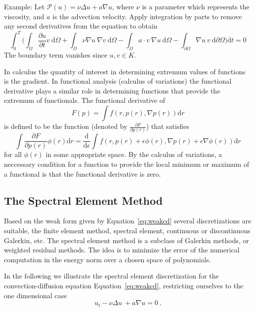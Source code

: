 \documentclass[10pt]{article}
\renewcommand{\d}{\mathrm{d}}
\begin{document}
{Example: Let $\mathcal P( u) = \nu \Delta  u +  a  \nabla  u$, where $\nu$ is a parameter which represents the viscosity, and $ a$ is the advection velocity. Apply integration by parts to remove any second derivatives from the equation to obtain
\begin{equation}
\int_0^T \bigg( \int_{\Omega}\frac{\partial u}{\partial t}  v \ \d \Omega + \int_{\Omega} \nu\nabla  u\ \nabla  v\ \d \Omega - \int_{\Omega}  a \cdot  v\ \nabla  u\ \d \Omega-
 \int_{\partial \Omega} \nabla  u \  v\  \d \partial \Omega \bigg) \d t =0\label{eq:weakcd}
\end{equation}
The boundary term vanishes since $ u,  v \in K.$

In calculus the quantity of interest in determining extremum values of functions is the gradient. In functional analysis (calculus of variations) the functional
derivative plays a similar role in determining functions that provide the extremum of functionals. The functional derivative of
\[
F(p) = \int f(r,p(r),\nabla p(r)) \d r
\]
is defined to be the function (denoted by $ \frac{\partial F}{\partial p(r)}$) that satisfies
\[
\int \frac{\partial F}{\partial p(r)} \phi(r) \d r = \frac{\d}{\d \epsilon} \int f(r,p(r) + \epsilon \phi(r),\nabla p(r) + \epsilon \nabla \phi(r) ) \d r
\]
for all $ \phi(r)$ in some appropriate space. By the calculus of variations, a neccessary condition for a function to provide the local
minimum or maximum of a functional is that the functional derivative is zero.




\subsection{The Spectral Element Method}
\label{sec:sem}

Based on the weak form given by Equation~\ref{eq:weakcd} several discretizations are suitable, the finite element method, spectral element, continuous or discontinuous Galerkin, etc.
The spectral element method is a subclass of Galerkin methods, or weighted residual methods. 
The idea is to minimize the error of the numerical computation in the energy norm over a chosen space of polynomials. 

In the following we illustrate the spectral element discretization for the convection-diffusion equation Equation~\ref{eq:weakcd}, restricting ourselves to the one dimensional case
\begin{equation}
u_t - \nu\Delta u\ +a \nabla u=0\ . \label{eq:1dcd}
\end{equation}

}
\end{document}
